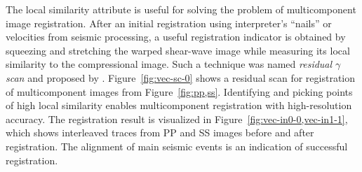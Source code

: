 The local similarity attribute is useful for solving the problem of
multicomponent image registration. After an initial registration using
interpreter's ``nails'' \cite[]{TLE23-12-12701281} or velocities from
seismic processing, a useful registration indicator is obtained by
squeezing and stretching the warped shear-wave image while measuring
its local similarity to the compressional image. Such a technique was
named \emph{residual $\gamma$ scan} and proposed by \cite{warp}.
Figure~\ref{fig:vec-sc-0} shows a residual scan for registration of
multicomponent images from Figure~\ref{fig:pp,ss}. Identifying and
picking points of high local similarity enables multicomponent
registration with high-resolution accuracy. The registration result is
visualized in Figure~\ref{fig:vec-in0-0,vec-in1-1}, which shows
interleaved traces from PP and SS images before and after
registration. The alignment of main seismic events is an indication of
successful registration.





